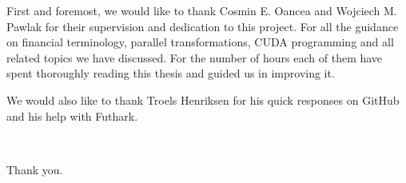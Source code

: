 First and foremost, we would like to thank Cosmin E. Oancea and Wojciech M. Pawlak for their supervision and dedication to this project. For all the guidance on financial terminology, parallel transformations, CUDA programming and all related topics we have discussed. For the number of hours each of them have spent thoroughly reading this thesis and guided us in improving it. 

We would also like to thank Troels Henriksen for his quick responses on GitHub and his help with Futhark.

\\
\begin{center}
Thank you.    
\end{center}
